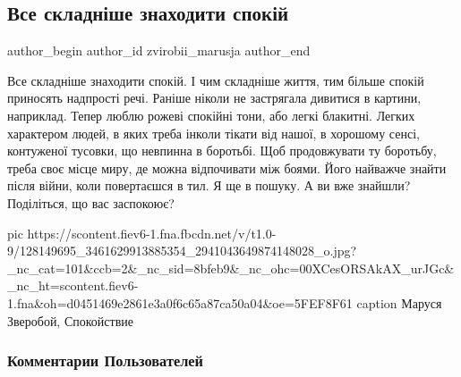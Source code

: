  
 
 
 
 
 
\subsection{Все складніше знаходити спокій}
\label{sec:27_11_2020.fb.zvirobii_marusja.1.spokii}
\ifcmt
	author_begin
   author_id zvirobii_marusja
	author_end
\fi

Все складніше знаходити спокій. І чим складніше життя, тим більше спокій
приносять надпрості речі. Раніше ніколи не застрягала дивитися в картини,
наприклад.  Тепер люблю рожеві спокійні тони, або легкі блакитні. Легких
характером людей, в яких треба інколи тікати від нашої, в хорошому сенсі,
контуженої тусовки, що невпинна в боротьбі. Щоб продовжувати ту боротьбу, треба
своє місце миру, де можна відпочивати між боями. Його найважче знайти після
війни, коли повертаєшся в тил. Я ще в пошуку. А ви вже знайшли? Поділіться, що
вас заспокоює?

\ifcmt
pic https://scontent.fiev6-1.fna.fbcdn.net/v/t1.0-9/128149695_3461629913885354_2941043649874148028_o.jpg?_nc_cat=101&ccb=2&_nc_sid=8bfeb9&_nc_ohc=00XCesORSAkAX_urJGc&_nc_ht=scontent.fiev6-1.fna&oh=d0451469e2861e3a0f6c65a87ca50a04&oe=5FEF8F61
caption Маруся Зверобой, Спокойствие
\fi

\subsubsection{Комментарии Пользователей}

